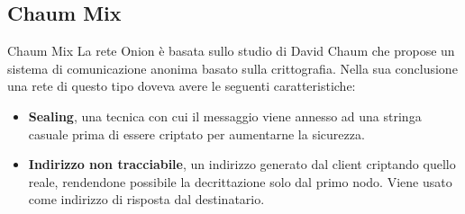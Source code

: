 \begin{frame}
    \begin{figure}[htpb!]
        \centering
        
    \end{figure}
\end{frame}

\subsection{Chaum Mix}
\begin{frame}{Chaum Mix}
    La rete Onion è basata sullo studio di David Chaum che propose un sistema di comunicazione anonima basato sulla crittografia. Nella sua conclusione una rete di questo tipo doveva avere le seguenti caratteristiche:
    \begin{itemize}
        \item \textbf{Sealing}, una tecnica con cui il messaggio viene annesso ad una stringa casuale prima di essere criptato per aumentarne la sicurezza.
        \item \textbf{Indirizzo non tracciabile}, un indirizzo generato dal client criptando quello reale, rendendone possibile la decrittazione solo dal primo nodo. Viene usato come indirizzo di risposta dal destinatario.
    \end{itemize}
\end{frame}